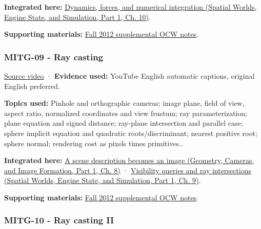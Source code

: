 \textbf{Integrated here:} \href{../05-Spatial-Worlds-Engine-State-and-Simulation-P01/main.pdf\#nameddest=04-visual-computing-ii-ch029-dynamics-forces-and-numerical-integration}{Dynamics, forces, and numerical integration (Spatial Worlds, Engine State, and Simulation, Part 1, Ch. 10)}.

\textbf{Supporting materials:} \href{https://ocw.mit.edu/courses/6-837-computer-graphics-fall-2012/pages/lecture-notes/}{Fall 2012 supplemental OCW notes}.

\subsubsection{MITG-09 - Ray casting}\label{04-visual-computing-ii-ch036-mitg-09---ray-casting}

\hypertarget{04-visual-computing-ii-ch036-mitg-09---ray-casting}{}

\href{https://www.youtube.com/watch?v=mJHGcDc37kY}{Source video} · \textbf{Evidence used:} YouTube English automatic captions, original English preferred.

\textbf{Topics used:} Pinhole and orthographic cameras; image plane, field of view, aspect ratio, normalized coordinates and view frustum; ray parameterization; plane equation and signed distance; ray-plane intersection and parallel case; sphere implicit equation and quadratic roots/discriminant; nearest positive root; sphere normal; rendering cost as pixels times primitives..

\textbf{Integrated here:} \href{../03-Geometry-Cameras-and-Image-Formation-P01/main.pdf\#nameddest=03-visual-computing-i-ch001-a-scene-description-becomes-an-image}{A scene description becomes an image (Geometry, Cameras, and Image Formation, Part 1, Ch. 8)} · \href{../05-Spatial-Worlds-Engine-State-and-Simulation-P01/main.pdf\#nameddest=04-visual-computing-ii-ch028-visibility-queries-and-ray-intersections-1}{Visibility queries and ray intersections (Spatial Worlds, Engine State, and Simulation, Part 1, Ch. 9)}.

\textbf{Supporting materials:} \href{https://ocw.mit.edu/courses/6-837-computer-graphics-fall-2012/pages/lecture-notes/}{Fall 2012 supplemental OCW notes}.

\subsubsection{MITG-10 - Ray casting II}\label{04-visual-computing-ii-ch036-mitg-10---ray-casting-ii}


